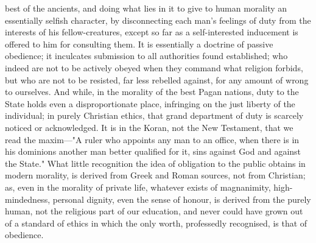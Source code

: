 \documentclass[12pt]{article}
\begin{document}
best of the ancients, and doing what lies in it to give to human morality an essentially selfish character, by disconnecting each man's feelings of duty from the interests of his fellow-creatures, except so far as a self-interested inducement is offered to him for consulting them. It is essentially a doctrine of passive obedience; it inculcates submission to all authorities found established; who indeed are not to be actively obeyed when they command what religion forbids, but who are not to be resisted, far less rebelled against, for any amount of wrong to ourselves. And while, in the morality of the best Pagan nations, duty to the State holds even a disproportionate place, infringing on the just liberty of the individual; in purely Christian ethics, that grand department of duty is scarcely noticed or acknowledged. It is in the Koran, not the New Testament, that we read the maxim---"A ruler who appoints any man to an office, when there is in his dominions another man better qualified for it, sins against God and against the State." What little recognition the idea of obligation to the public obtains in modern morality, is derived from Greek and Roman sources, not from Christian; as, even in the morality of private life, whatever exists of magnanimity, high-mindedness, personal dignity, even the sense of honour, is derived from the purely human, not the religious part of our education, and never could have grown out of a standard of ethics in which the only worth, professedly recognised, is that of obedience.
\end{document}
